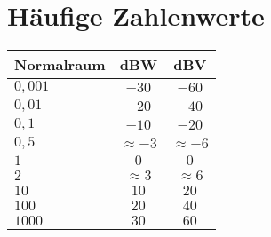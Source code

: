 \section{Häufige Zahlenwerte}

\begin{table}[!htb]
    \centering
    \begin{tabular}{|l|c|c|}
        \hline
        \textbf{Normalraum} & \textbf{dBW}  & \textbf{dBV}  \\ \hline
        $0,001$             & $-30$         & $-60$         \\
        $0,01$              & $-20$         & $-40$         \\
        $0,1$               & $-10$         & $-20$         \\
        $0,5$               & $\approx-3$   & $\approx-6$   \\
        $1$                 & $0$           & $0$           \\
        $2$                 & $\approx 3$   & $\approx 6$   \\
        $10$                & $10$          & $20$          \\
        $100$               & $20$          & $40$          \\
        $1000$              & $30$          & $60$          \\ \hline
    \end{tabular}
\end{table}


